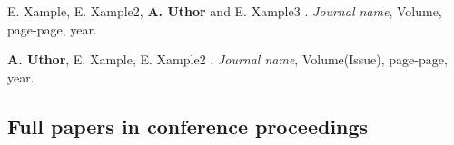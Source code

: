 \documentclass[12pt,a4paper]{extarticle}
\begin{document}
\vspace*{1em}

\begin{enumerate}[wide = 0pt, widest = {[4]}, leftmargin =*]

\item[{[1]}] E. Xample, E. Xample2, \textbf{A. Uthor} and E. Xample3
.
\newblock \emph{Journal name}, Volume, page-page, year.

\vspace*{1em}

\item[{[2]}] \textbf{A. Uthor}, E. Xample, E. Xample2
.
\newblock \emph{Journal name}, Volume(Issue), page-page, year.

\end{enumerate}

\vspace*{1em}

\subsection*{Full papers in conference proceedings}
\vspace*{1em}
\end{document}
